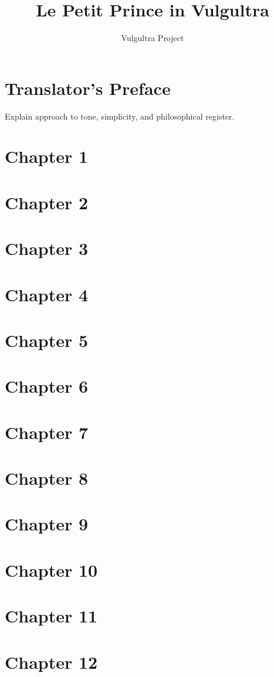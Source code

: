 \documentclass[12pt]{book}
\title{Le Petit Prince in Vulgultra}
\author{Vulgultra Project}
\date{}
\begin{document}
\maketitle
\tableofcontents

\chapter{Translator's Preface}
Explain approach to tone, simplicity, and philosophical register.

\chapter{Chapter 1}
\chapter{Chapter 2}
\chapter{Chapter 3}
\chapter{Chapter 4}
\chapter{Chapter 5}
\chapter{Chapter 6}
\chapter{Chapter 7}
\chapter{Chapter 8}
\chapter{Chapter 9}
\chapter{Chapter 10}
\chapter{Chapter 11}
\chapter{Chapter 12}
\end{document}
